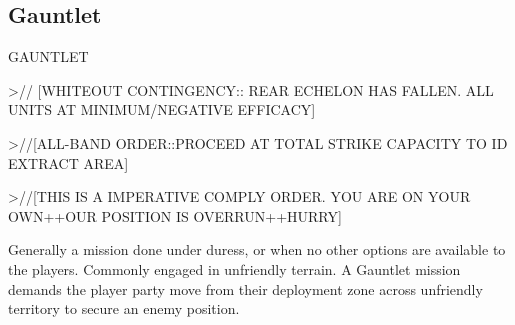                                                                                                           

\subsection{Gauntlet}
                                                              

                                                             GAUNTLET  

                                                             >// [WHITEOUT CONTINGENCY:: REAR  
                                                             ECHELON HAS FALLEN. ALL UNITS AT  
                                                             MINIMUM/NEGATIVE EFFICACY]   

                                                             >//[ALL-BAND ORDER::PROCEED AT TOTAL  
                                                             STRIKE CAPACITY TO ID EXTRACT AREA]  

                                                             >//[THIS IS A IMPERATIVE COMPLY ORDER.  
                                                             YOU ARE ON YOUR OWN++OUR POSITION  
                                                             IS OVERRUN++HURRY]   

                                                             Generally a mission done under duress, or  
                                                            when no other options are available to the  
                                                             players. Commonly engaged in unfriendly  
                                                            terrain. A Gauntlet mission demands the  
                                                             player party move from their deployment zone  
                                                             across unfriendly territory to secure an enemy  
                                                             position.  

